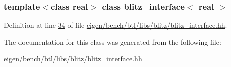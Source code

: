 \subsubsection*{template$<$class real$>$\newline
class blitz\+\_\+interface$<$ real $>$}



Definition at line \hyperlink{eigen_2bench_2btl_2libs_2blitz_2blitz__interface_8hh_source_l00034}{34} of file \hyperlink{eigen_2bench_2btl_2libs_2blitz_2blitz__interface_8hh_source}{eigen/bench/btl/libs/blitz/blitz\+\_\+interface.\+hh}.



The documentation for this class was generated from the following file\+:\begin{DoxyCompactItemize}
\item 
eigen/bench/btl/libs/blitz/blitz\+\_\+interface.\+hh\end{DoxyCompactItemize}
